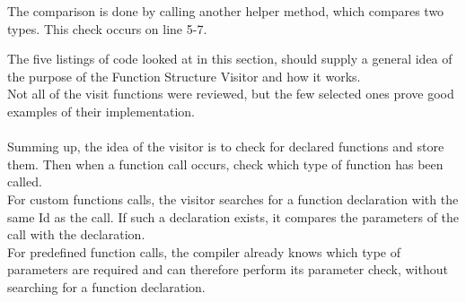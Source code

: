 The comparison is done by calling another helper method, which compares two types. This check occurs on line 5-7.

\noindent\newline
The five listings of code looked at in this section, should supply a general idea of the purpose of the Function Structure Visitor and how it works.\\
Not all of the visit functions were reviewed, but the few selected ones prove good examples of their implementation.
\\\\
Summing up, the idea of the visitor is to check for declared functions and store them. Then when a function call occurs, check which type of function has been called.\\
For custom functions calls, the visitor searches for a function declaration with the same Id as the call. If such a declaration exists, it compares the parameters of the call with the declaration.\\
For predefined function calls, the compiler already knows which type of parameters are required and can therefore perform its parameter check, without searching for a function declaration.